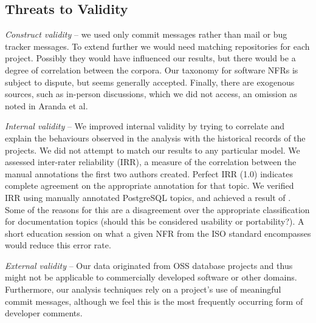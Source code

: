 \documentclass[smallextended]{svjour3}       %
\begin{document}
\subsection{Threats to Validity}
\emph{Construct validity} -- we used only commit messages rather than
mail or bug tracker messages. 
To extend further we would need matching repositories for each project.
Possibly they would have influenced our results, but there would be a degree of correlation between the corpora.
Our taxonomy for software NFRs is subject to dispute, but seems
generally accepted. Finally, there are exogenous sources, such as
in-person discussions, which we did not access, an omission as noted
in Aranda et al.~\cite{aranda09icse} %

\emph{Internal validity} -- %
We improved internal validity by trying to correlate and explain the behaviours observed in the analysis with the historical records of the projects.
We did not attempt to match our results to any particular model.
We assessed inter-rater reliability (IRR), a measure of the correlation between the manual annotations the first two authors created. Perfect IRR (1.0) indicates complete agreement 
on the appropriate annotation for that topic. We verified IRR using manually annotated PostgreSQL topics, and achieved a result of . 
Some of the reasons for this are a disagreement over the appropriate classification for documentation topics (should this be considered
usability or portability?). A short education session on what a given NFR from the ISO standard encompasses would reduce this error rate.

\emph{External validity} -- %
Our data originated from OSS database projects and thus might not be applicable to commercially developed software or other domains. 
Furthermore, our analysis techniques rely on a project's use of meaningful commit messages, although we feel this is the most frequently occurring form
of developer comments. 
\end{document}
